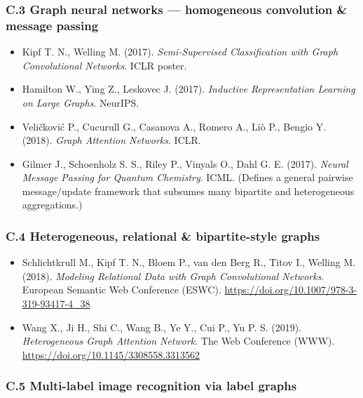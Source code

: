 \documentclass[
  11pt,
]{article}
\begin{document}
\subsubsection{C.3 Graph neural networks --- homogeneous convolution \&
message
passing}\label{c.3-graph-neural-networks-homogeneous-convolution-message-passing}

\begin{itemize}
\item
  Kipf T. N., Welling M. (2017). \emph{Semi-Supervised Classification
  with Graph Convolutional Networks}. ICLR poster.
\item
  Hamilton W., Ying Z., Leskovec J. (2017). \emph{Inductive
  Representation Learning on Large Graphs}. NeurIPS.
\item
  Veličković P., Cucurull G., Casanova A., Romero A., Liò P., Bengio Y.
  (2018). \emph{Graph Attention Networks}. ICLR.
\item
  Gilmer J., Schoenholz S. S., Riley P., Vinyals O., Dahl G. E. (2017).
  \emph{Neural Message Passing for Quantum Chemistry}. ICML. (Defines a
  general pairwise message/update framework that subsumes many bipartite
  and heterogeneous aggregations.)
\end{itemize}

\subsubsection{C.4 Heterogeneous, relational \& bipartite-style
graphs}\label{c.4-heterogeneous-relational-bipartite-style-graphs}

\begin{itemize}
\item
  Schlichtkrull M., Kipf T. N., Bloem P., van den Berg R., Titov I.,
  Welling M. (2018). \emph{Modeling Relational Data with Graph
  Convolutional Networks}. European Semantic Web Conference (ESWC).
  \url{https://doi.org/10.1007/978-3-319-93417-4_38}
\item
  Wang X., Ji H., Shi C., Wang B., Ye Y., Cui P., Yu P. S. (2019).
  \emph{Heterogeneous Graph Attention Network}. The Web Conference
  (WWW). \url{https://doi.org/10.1145/3308558.3313562}
\end{itemize}

\subsubsection{C.5 Multi-label image recognition via label
graphs}\label{c.5-multi-label-image-recognition-via-label-graphs}
\end{document}
